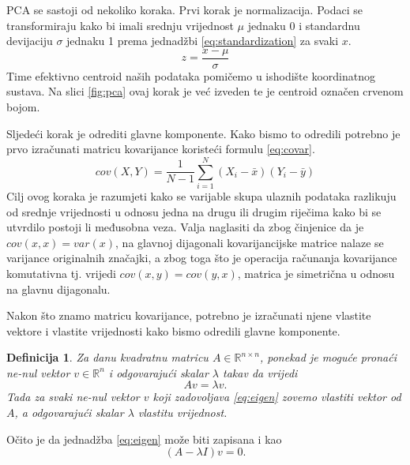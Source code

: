\documentclass[times, utf8, diplomski]{fer}
\newtheorem{definition}{Definicija}         %
\begin{document}
PCA se sastoji od nekoliko koraka.
Prvi korak je normalizacija. Podaci se transformiraju kako bi imali srednju vrijednost $\mu$ jednaku 0 i standardnu devijaciju $\sigma$ jednaku 1 prema jednadžbi \ref{eq:standardization} za svaki \(x\).
\begin{equation}
    z = \frac{x - \mu}{\sigma}
    \label{eq:standardization}
\end{equation}
Time efektivno centroid naših podataka pomičemo u ishodište koordinatnog sustava. Na slici \ref{fig:pca} ovaj korak je već izveden te je centroid označen crvenom bojom.

Sljedeći korak je odrediti glavne komponente. Kako bismo to odredili potrebno je prvo izračunati matricu kovarijance koristeći formulu \ref{eq:covar}.
\begin{equation}
    cov(X, Y) = \frac{1}{N - 1}\sum_{i=1}^{N} (X_i - \bar{x})(Y_i - \bar{y})
    \label{eq:covar}
\end{equation}
Cilj ovog koraka je razumjeti kako se varijable skupa ulaznih podataka razlikuju od srednje vrijednosti u odnosu jedna na drugu ili drugim riječima kako bi se utvrdilo postoji li međusobna veza. Valja naglasiti da zbog činjenice da je $cov(x, x) = var(x)$, na glavnoj dijagonali kovarijancijske matrice nalaze se varijance originalnih značajki, a zbog toga što je operacija računanja kovarijance komutativna tj. vrijedi $cov(x,y) = cov(y, x)$, matrica je simetrična u odnosu na glavnu dijagonalu.

Nakon što znamo matricu kovarijance, potrebno je izračunati njene vlastite vektore  i vlastite vrijednosti  kako bismo odredili glavne komponente.

\begin{definition}
    Za danu kvadratnu matricu $A \in \mathbb{R}^{n \times n}$, ponekad je moguće pronaći ne-nul vektor $v \in \mathbb{R}^n$ i odgovarajući skalar $\lambda$ takav da vrijedi
    \begin{equation}
        Av = \lambda v.
        \label{eq:eigen}
    \end{equation}
    Tada za svaki ne-nul vektor $v$ koji zadovoljava \ref{eq:eigen} zovemo vlastiti vektor od $A$, a odgovarajući skalar $\lambda$ vlastitu vrijednost.
\end{definition}
Očito je da jednadžba \ref{eq:eigen} može biti zapisana i kao
\begin{equation}
    (A - \lambda I)v = 0.
\end{equation}
\end{document}
